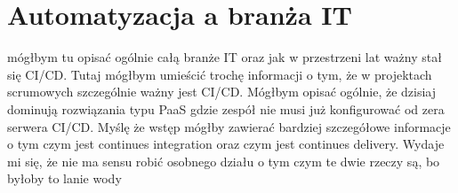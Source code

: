 \section{Automatyzacja a branża IT}
mógłbym tu opisać ogólnie całą branże IT oraz jak w przestrzeni lat ważny stał się CI/CD. Tutaj mógłbym umieścić trochę informacji o tym, że w projektach scrumowych szczególnie ważny jest CI/CD. Mógłbym opisać ogólnie, że dzisiaj dominują rozwiązania typu PaaS gdzie zespół nie musi już konfigurować od zera serwera CI/CD. Myślę że wstęp mógłby zawierać bardziej szczegółowe informacje o tym czym jest continues integration oraz czym jest continues delivery. Wydaje mi się, że nie ma sensu robić osobnego działu o tym czym te dwie rzeczy są, bo byłoby to lanie wody